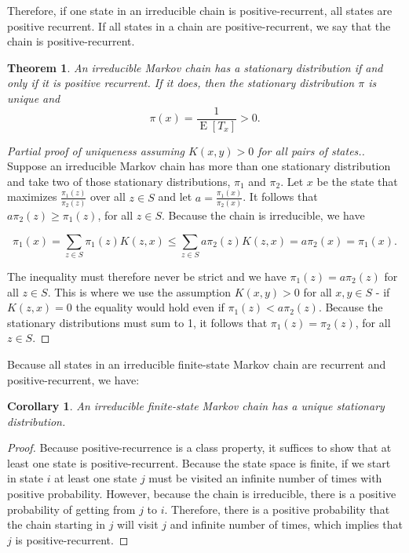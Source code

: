 \documentclass{book}
\theoremstyle{plain}%
\newtheorem{theorem}{Theorem}[section]
\newtheorem{corollary}{Corollary}[section]
\theoremstyle{definition}
\DeclareMathOperator{\E}{E}
\begin{document}
Therefore, if one state in an irreducible chain is positive-recurrent, all states are positive recurrent. If all states in a chain are positive-recurrent, we say that the chain is positive-recurrent.

\begin{theorem} An irreducible Markov chain has a stationary distribution if and only if it is positive recurrent. If it does, then the stationary distribution $\pi$ is unique and
$$\pi(x) = \frac{1}{\E[T_x]} > 0.$$
\end{theorem}

\begin{proof}[Partial proof of uniqueness assuming $K(x,y) > 0$ for all pairs of states.]
Suppose an irreducible Markov chain has more than one stationary distribution and take two of those stationary distributions, $\pi_1$ and $\pi_2$. Let $x$ be the state that maximizes $\frac{\pi_1(z)}{\pi_2(z)}$ over all $z \in S$ and let $a = \frac{\pi_1(x)}{\pi_2(x)}$.  It follows that $a\pi_2(z) \geq \pi_1(z)$, for all $z \in S$. Because the chain is irreducible, we have

$$\pi_1(x) = \sum_{z \in S} \pi_1(z) K(z,x) \leq \sum_{z \in S} a\pi_2(z) K(z,x) = a\pi_2(x) = \pi_1(x).$$

The inequality must therefore never be strict and we have $\pi_1(z) = a\pi_2(z)$ for all $z \in S$. This is where we use the assumption $K(x,y) > 0$ for all $x, y \in S$ - if $K(z, x) = 0$ the equality would hold even if $\pi_1(z) < a\pi_2(z)$. Because the stationary distributions must sum to 1, it follows that $\pi_1(z) = \pi_2(z)$, for all $z \in S$.
\end{proof}

Because all states in an irreducible finite-state Markov chain are recurrent and positive-recurrent, we have:

\begin{corollary} An irreducible finite-state Markov chain has a unique stationary distribution.
\end{corollary}

\begin{proof} Because positive-recurrence is a class property, it suffices to show that at least one state is positive-recurrent. Because the state space is finite, if we start in state $i$ at least one state $j$ must be visited an infinite number of times with positive probability. However, because the chain is irreducible, there is a positive probability of getting from $j$ to $i$. Therefore, there is a positive probability that the chain starting in $j$ will visit $j$ and infinite number of times, which implies that $j$ is positive-recurrent.
\end{proof}
\end{document}
